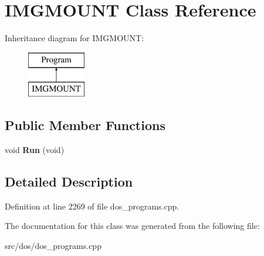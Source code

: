 \hypertarget{classIMGMOUNT}{\section{I\-M\-G\-M\-O\-U\-N\-T Class Reference}
\label{classIMGMOUNT}
}
Inheritance diagram for I\-M\-G\-M\-O\-U\-N\-T\-:\begin{figure}[H]
\begin{center}
\leavevmode
\includegraphics[height=2.000000cm]{classIMGMOUNT}
\end{center}
\end{figure}
\subsection*{Public Member Functions}
\begin{DoxyCompactItemize}
\item 
\hypertarget{classIMGMOUNT_abd99efa1dffda2e6f5640ebcd4781852}{void {\bfseries Run} (void)}\label{classIMGMOUNT_abd99efa1dffda2e6f5640ebcd4781852}

\end{DoxyCompactItemize}


\subsection{Detailed Description}


Definition at line 2269 of file dos\-\_\-programs.\-cpp.



The documentation for this class was generated from the following file\-:\begin{DoxyCompactItemize}
\item 
src/dos/dos\-\_\-programs.\-cpp\end{DoxyCompactItemize}

